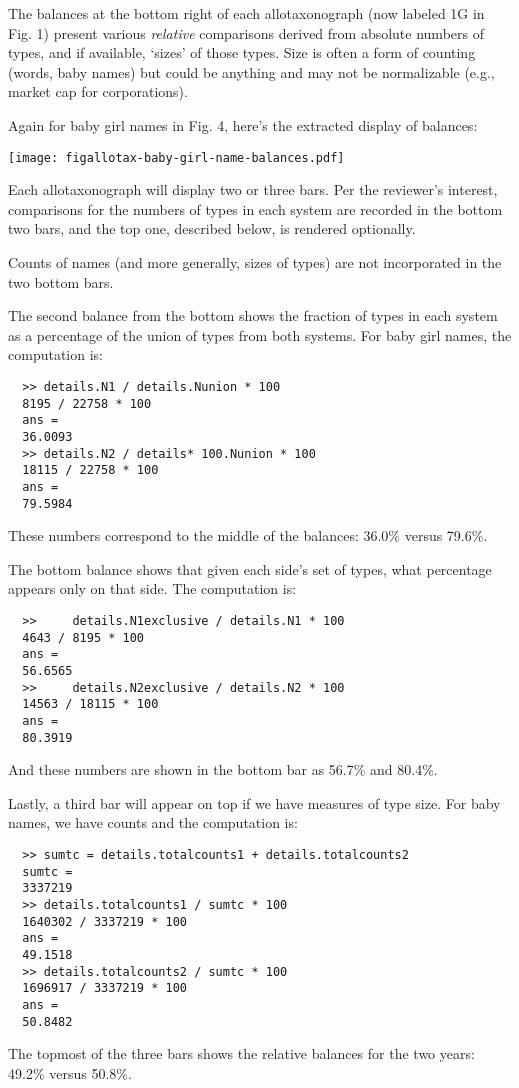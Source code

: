 The balances at the bottom right of each allotaxonograph
(now labeled 1G in Fig. 1) present various
\textit{relative} comparisons derived from absolute numbers of types,
and if available, `sizes' of those types.
Size is often a form of counting (words, baby names) but could
be anything and may not be normalizable (e.g., market cap for corporations).

Again for baby girl names in Fig. 4, here's the extracted display of balances:
\begin{center}
  \texttt{[image: figallotax-baby-girl-name-balances.pdf]}
\end{center}

Each allotaxonograph will display two or three bars.
Per the reviewer's interest,
comparisons for the numbers of types in each system
are recorded in the bottom two bars,
and the top one, described below, is rendered optionally.

Counts of names (and more generally, sizes of types)
are not incorporated in the two bottom bars.

The second balance from the bottom shows the fraction of types in each system
as a percentage of the union of types from both systems.
For baby girl names, the computation is:
\begin{lstlisting}
  >> details.N1 / details.Nunion * 100 
  8195 / 22758 * 100
  ans =
  36.0093
  >> details.N2 / details* 100.Nunion * 100 
  18115 / 22758 * 100
  ans =
  79.5984
\end{lstlisting}
These numbers correspond to the middle of the balances: 36.0\% versus 79.6\%.

The bottom balance shows that given each side's set of types,
what percentage appears only on that side.
The computation is:
\begin{lstlisting}
  >>     details.N1exclusive / details.N1 * 100
  4643 / 8195 * 100
  ans =
  56.6565
  >>     details.N2exclusive / details.N2 * 100
  14563 / 18115 * 100
  ans =
  80.3919
\end{lstlisting}
And these numbers are shown in the bottom bar as 56.7\% and 80.4\%.

Lastly, a third bar will appear on top if we have measures of type size.
For baby names, we have counts and the computation is:
\begin{lstlisting}
  >> sumtc = details.totalcounts1 + details.totalcounts2  
  sumtc =
  3337219
  >> details.totalcounts1 / sumtc * 100                  
  1640302 / 3337219 * 100
  ans =
  49.1518
  >> details.totalcounts2 / sumtc * 100
  1696917 / 3337219 * 100
  ans =
  50.8482
\end{lstlisting}
The topmost of the three bars shows the relative balances for the two years:
49.2\% versus 50.8\%.

